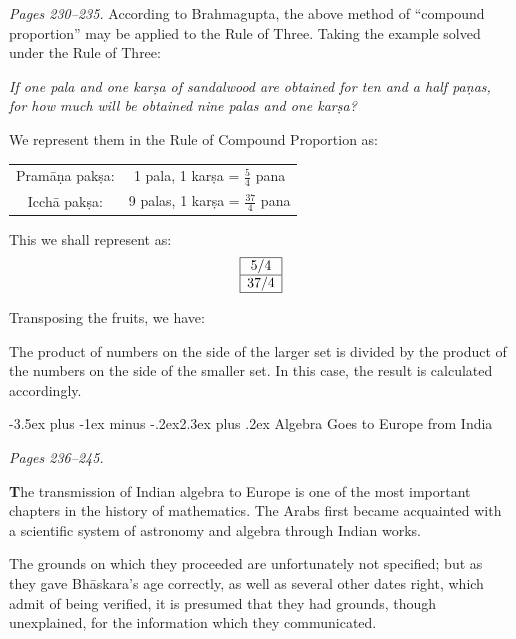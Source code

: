 \documentclass[11pt,a4paper]{article}
\makeatletter
\renewcommand{\section}{\@startsection {section}{1}{\z@}%
  {-3.5ex plus -1ex minus -.2ex}{2.3ex plus .2ex}%
  {\normalfont\Large\bfseries\color{sectioncolor}}}
\newcommand{\cnote}[1]{\textcolor{notecolor}{\textit{#1}}}
\makeatother
\begin{document}
\cnote{Pages 230--235.} According to Brahmagupta, the above method of ``compound proportion'' may be applied to the Rule of Three. Taking the example solved under the Rule of Three:

\textit{If one pala and one karṣa of sandalwood are obtained for ten and a half paṇas, for how much will be obtained nine palas and one karṣa?}

We represent them in the Rule of Compound Proportion as:

\begin{center}
\begin{tabular}{cc}
Pramāṇa pakṣa: & 1 pala, 1 karṣa = $\frac{5}{4}$ pana \\
Icchā pakṣa: & 9 palas, 1 karṣa = $\frac{37}{4}$ pana \\
\end{tabular}
\end{center}

This we shall represent as:
\[
\begin{array}{|c|}
\hline
5/4 \\
\hline
37/4 \\
\hline
\end{array}
\]

Transposing the fruits, we have:

The product of numbers on the side of the larger set is divided by the product of the numbers on the side of the smaller set. In this case, the result is calculated accordingly.

\section{Algebra Goes to Europe from India}
\label{sec:algebra-europe}

\cnote{Pages 236--245.}

\textbf{T}he transmission of Indian algebra to Europe is one of the most important chapters in the history of mathematics. The Arabs first became acquainted with a scientific system of astronomy and algebra through Indian works.

The grounds on which they proceeded are unfortunately not specified; but as they gave Bhāskara's age correctly, as well as several other dates right, which admit of being verified, it is presumed that they had grounds, though unexplained, for the information which they communicated.
\end{document}
